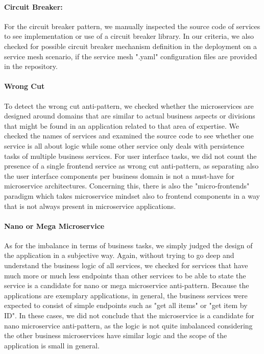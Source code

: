 \documentclass{Configuration_Files/PoliMi3i_thesis}
\begin{document}
\paragraph{Circuit Breaker:} For the circuit breaker pattern, we manually inspected the source code of services to see implementation or use of a circuit breaker library.
In our criteria, we also checked for possible circuit breaker mechanism definition in the deployment on a service mesh scenario, if the service mesh ".yaml" configuration files are provided in the repository.

\paragraph{Wrong Cut} To detect the wrong cut anti-pattern, we checked whether the microservices are designed around domains that are similar to actual business aspects or divisions that might be found in an application related to that area of expertise.
We checked the names of services and examined the source code to see whether one service is all about logic while some other service only deals with persistence tasks of multiple business services.
For user interface tasks, we did not count the presence of a single frontend service as wrong cut anti-pattern, as separating also the user interface components per business domain is not a must-have for microservice architectures.
Concerning this, there is also the "micro-frontends"\footnotemark[62] paradigm which takes microservice mindset also to frontend components in a way that is not always present in microservice applications.

\paragraph{Nano or Mega Microservice} As for the imbalance in terms of business tasks, we simply judged the design of the application in a subjective way.
Again, without trying to go deep and understand the business logic of all services, we checked for services that have much more or much less endpoints than other services to be able to state the service is a candidate for nano or mega microservice anti-pattern.
Because the applications are exemplary applications, in general, the business services were expected to consist of simple endpoints such as "get all items" or "get item by ID".
In these cases, we did not conclude that the microservice is a candidate for nano microservice anti-pattern, as the logic is not quite imbalanced considering the other business microservices have similar logic and the scope of the application is small in general.
\end{document}
